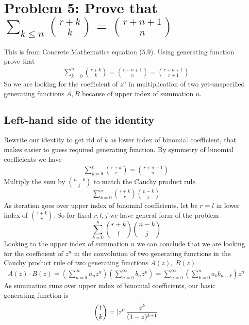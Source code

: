﻿\section{Problem 5: Prove that $\sum_{k \leq n} \binom{r+k}{k} = \binom{r+n+1}{n}$}
\label{sec:problem-5:-concrete-mathematics-5.9}
This is from Concrete Mathematics equation (5.9).
Using generating function prove that
\begin{align}
    \sum_{k=0}^{n} \binom{r+k}{k} = \binom{r+n+1}{n} = \binom{r+n+1}{r+1}
    \label{eq:identity-to-prove-problem-5}
\end{align}
So we are looking for the coefficient of $z^n$ in multiplication
of two yet-unspecified generating functions $A, B$ because of upper index of summation $n$.

\subsection{Left-hand side of the identity}\label{subsec:left-hand-side-of-the-identity}
Rewrite our identity to get rid of $k$ as lower index of binomial coefficient,
that makes easier to guess required generating function.
By symmetry of binomial coefficients we have
\begin{align*}
    \sum_{k=0}^{n} \binom{r+k}{r} = \binom{r+n+1}{n}
\end{align*}
Multiply the sum by $\binom{n-k}{j}$ to match the Cauchy product rule
\begin{align*}
    \sum_{k=0}^{n} \binom{r+k}{r} \binom{n-k}{j}
\end{align*}
As iteration goes over upper index of binomial coefficients, let be $r=l$ in
lower index of $\binom{r+k}{r}$.
So for fixed $r, l, j$ we have general form of the problem
\begin{equation}
    \sum_{k=0}^{n} \binom{r+k}{l} \binom{n-k}{j}
    \label{eq:problem-5-general-form}
\end{equation}
Looking to the upper index of summation $n$ we can conclude that we are looking for
the coefficient of $z^n$ in the convolution of two generating functions in the
Cauchy product rule of two generating functions $A(z), \; B(z)$
\begin{align*}
    A(z) \cdot B(z) = \left( \sum_{n=0}^{\infty} a_n z^n \right) \left( \sum_{n=0}^{\infty} b_n z^n \right)
    = \sum_{n=0}^{\infty} \left( \sum_{k=0}^{n} a_k b_{n-k} \right) z^n
\end{align*}
As summation runs over upper index of binomial coefficients, our basic generating function is
\begin{align*}
    \binom{t}{k} = [z^{t}] \frac{z^k}{(1-z)^{k+1}}
\end{align*}
